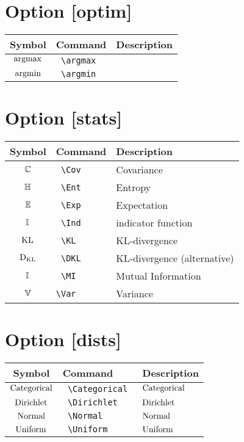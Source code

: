 \documentclass{article}
\begin{document}
\section*{Option [optim]}

\begin{tabular}{cll}
  Symbol & Command & Description \\
  \hline
  $\operatorname*{argmax}$ & \texttt{ \textbackslash argmax } & \\
  $\operatorname*{argmin}$ & \texttt{ \textbackslash argmin } & \\
\end{tabular}

\section*{Option [stats]}

\begin{tabular}{cll}
  Symbol & Command & Description \\
  \hline
  $\operatorname*{\mathbb{C}}$ & \texttt{ \textbackslash Cov } & Covariance \\
  $\operatorname*{\mathbb{H}}$ & \texttt{ \textbackslash Ent } & Entropy \\
  $\operatorname*{\mathbb{E}}$ & \texttt{ \textbackslash Exp } & Expectation \\
  $\operatorname*{\mathbb{I}}$ & \texttt{ \textbackslash Ind } & indicator function \\
  $\operatorname*{\operatorname{KL}}$ & \texttt{ \textbackslash KL } & KL-divergence \\
  $\operatorname*{{D_\text{KL}}}$ & \texttt{ \textbackslash DKL } & KL-divergence (alternative) \\
  $\operatorname*{\mathbb{I}}$ & \texttt{ \textbackslash MI } & Mutual Information \\
  $\operatorname*{\mathbb{V}}$ & \texttt{\textbackslash Var} & Variance \\
\end{tabular}

\section*{Option [dists]}

\begin{tabular}{cll}
  Symbol & Command & Description \\
  \hline
  $\operatorname{Categorical}$ & \texttt{ \textbackslash Categorical } & $\operatorname{Categorical}$ \\
  $\operatorname{Dirichlet}$ & \texttt{ \textbackslash Dirichlet } & $\operatorname{Dirichlet}$ \\
  $\operatorname{Normal}$ & \texttt{ \textbackslash Normal } & $\operatorname{Normal}$ \\
  $\operatorname{Uniform}$ & \texttt{ \textbackslash Uniform } & $\operatorname{Uniform}$ \\
\end{tabular}
\end{document}
